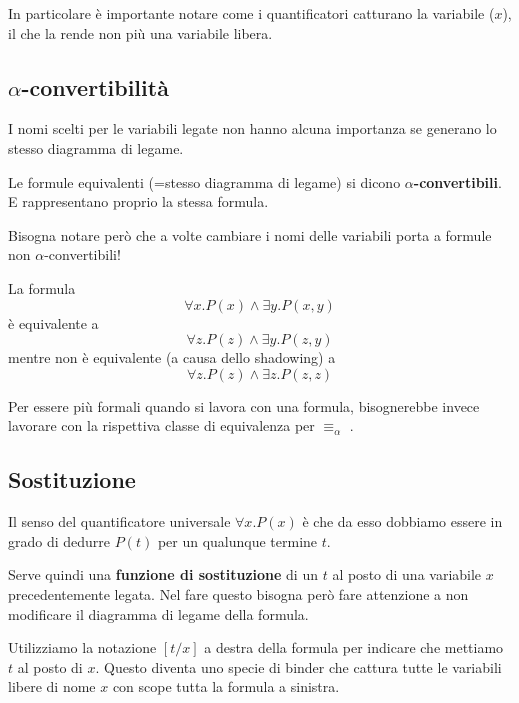 \documentclass[
  a4paper,
]{article}
\begin{document}
In particolare è importante notare come i quantificatori catturano la
variabile (\(x\)), il che la rende non più una variabile libera.

\hypertarget{alpha-convertibilituxe0}{%
\subsection{\texorpdfstring{\(\alpha\)-convertibilità}{\textbackslash alpha-convertibilità}}\label{alpha-convertibilituxe0}}

I nomi scelti per le variabili legate non hanno alcuna importanza se
generano lo stesso diagramma di legame.

Le formule equivalenti (=stesso diagramma di legame) si dicono
\textbf{\(\alpha\)-convertibili}. E rappresentano proprio la stessa
formula.

Bisogna notare però che a volte cambiare i nomi delle variabili porta a
formule non \(\alpha\)-convertibili!

\begin{examplebox}[Esempio]

La formula \[
\forall x.P(x) \land \exists y.P(x, y)
\] è equivalente a \[
\forall z.P(z) \land \exists y.P(z, y)
\] mentre non è equivalente (a causa dello shadowing) a \[
\forall z.P(z) \land \exists z.P(z, z)
\]

\end{examplebox}

Per essere più formali quando si lavora con una formula, bisognerebbe
invece lavorare con la rispettiva classe di equivalenza per
\(\equiv_\alpha\) .

\hypertarget{sostituzione}{%
\subsection{Sostituzione}\label{sostituzione}}

Il senso del quantificatore universale \(\forall x.P(x)\) è che da esso
dobbiamo essere in grado di dedurre \(P(t)\) per un qualunque termine
\(t\).

Serve quindi una \textbf{funzione di sostituzione} di un \(t\) al posto
di una variabile \(x\) precedentemente legata. Nel fare questo bisogna
però fare attenzione a non modificare il diagramma di legame della
formula.

Utilizziamo la notazione \([t/x]\) a destra della formula per indicare
che mettiamo \(t\) al posto di \(x\). Questo diventa uno specie di
binder che cattura tutte le variabili libere di nome \(x\) con scope
tutta la formula a sinistra.
\end{document}
